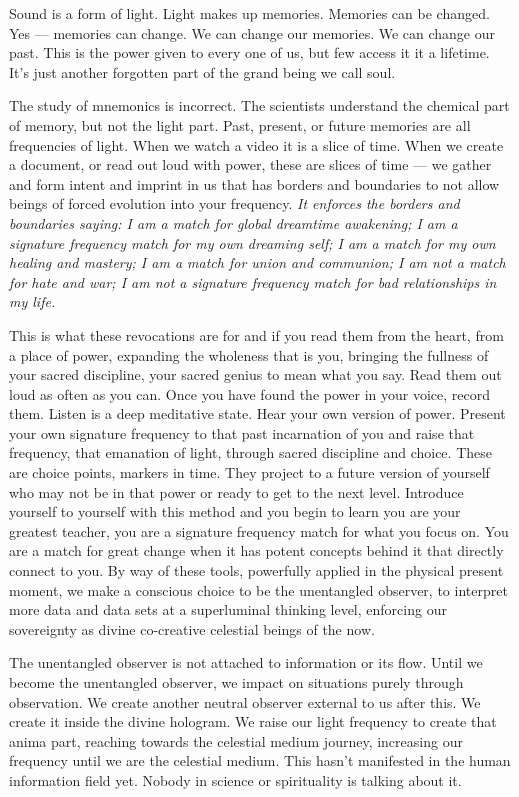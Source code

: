 Sound is a form of light. Light makes up memories. Memories can be
changed. Yes --- memories can change. We can change our memories. We can
change our past. This is the power given to every one of us, but few
access it it a lifetime. It's just another forgotten part of the grand
being we call soul.

The study of mnemonics is incorrect. The scientists understand the
chemical part of memory, but not the light part. Past, present, or
future memories are all frequencies of light. When we watch a video it
is a slice of time. When we create a document, or read out loud with
power, these are slices of time --- we gather and form intent and
imprint in us that has borders and boundaries to not allow beings of
forced evolution into your frequency. \emph{It enforces the borders and
boundaries saying: I am a match for global dreamtime awakening; I am a
signature frequency match for my own dreaming self; I am a match for my
own healing and mastery; I am a match for union and communion; I am not
a match for hate and war; I am not a signature frequency match for bad
relationships in my life.}

This is what these revocations are for and if you read them from the
heart, from a place of power, expanding the wholeness that is you,
bringing the fullness of your sacred discipline, your sacred genius to
mean what you say. Read them out loud as often as you can. Once you have
found the power in your voice, record them. Listen is a deep meditative
state. Hear your own version of power. Present your own signature
frequency to that past incarnation of you and raise that frequency, that
emanation of light, through sacred discipline and choice. These are
choice points, markers in time. They project to a future version of
yourself who may not be in that power or ready to get to the next level.
Introduce yourself to yourself with this method and you begin to learn
you are your greatest teacher, you are a signature frequency match for
what you focus on. You are a match for great change when it has potent
concepts behind it that directly connect to you. By way of these tools,
powerfully applied in the physical present moment, we make a conscious
choice to be the unentangled observer, to interpret more data and data
sets at a superluminal thinking level, enforcing our sovereignty as
divine co-creative celestial beings of the now.

The unentangled observer is not attached to information or its flow.
Until we become the unentangled observer, we impact on situations purely
through observation. We create another neutral observer external to us
after this. We create it inside the divine hologram. We raise our light
frequency to create that anima part, reaching towards the celestial
medium journey, increasing our frequency until we are the celestial
medium. This hasn't manifested in the human information field yet.
Nobody in science or spirituality is talking about it.

